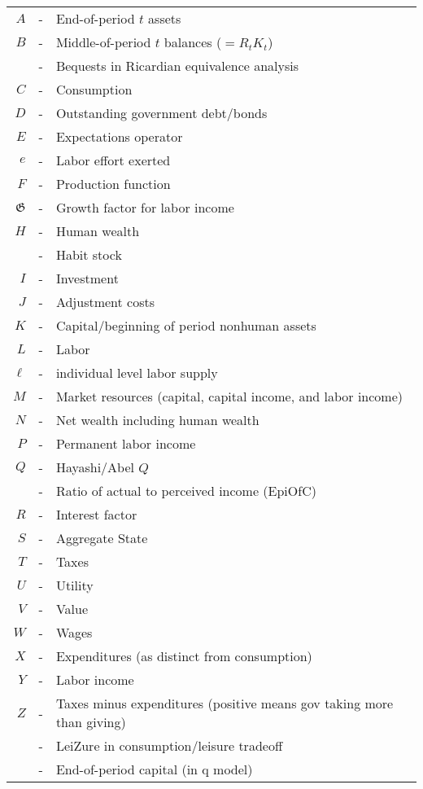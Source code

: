 \documentclass{lecturenotes}
\begin{document}
\begin{table}
\begin{tabular}{rcl}
    $A$ & - & End-of-period $t$ assets
\\  $B$ & - & Middle-of-period $t$ balances ($=R_{t} K_{t}$)
\\      & - & Bequests in Ricardian equivalence analysis
\\  $C$ & - & Consumption
\\  $D$ & - & Outstanding government debt/bonds
\\  $E$ & - & Expectations operator
\\  $e$ & - & Labor effort exerted
\\  $F$ & - & Production function
\\  $\mathfrak{G}$ & - & Growth factor for labor income
\\  $H$ & - & Human wealth
\\      & - & Habit stock
\\  $I$ & - & Investment
\\  $J$ & - & Adjustment costs
\\  $K$ & - & Capital/beginning of period nonhuman assets
\\  $L$ & - & Labor
\\  $\ell$ & - & individual level labor supply
\\  $M$ & - & Market resources (capital, capital income, and labor income)
\\  $N$ & - & Net wealth including human wealth
\\  $P$ & - & Permanent labor income
\\  $Q$ & - & Hayashi/Abel $Q$
\\      & - & Ratio of actual to perceived income (EpiOfC)
\\  $R$ & - & Interest factor
\\  $S$ & - & Aggregate State
\\  $T$ & - & Taxes
\\  $U$ & - & Utility
\\  $V$ & - & Value
\\  $W$ & - & Wages
\\  $X$ & - & Expenditures (as distinct from consumption)
\\  $Y$ & - & Labor income
\\  $Z$ & - & Taxes minus expenditures (positive means gov taking more than giving)
\\      & - & LeiZure in consumption/leisure tradeoff
\\      & - & End-of-period capital (in q model)

\end{tabular}
\end{table}
\end{document}
